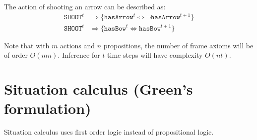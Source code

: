 \begin{description}
        \begin{example}
            The action of shooting an arrow can be described as:
            \[
                \begin{split}
                    \texttt{SHOOT}^t &\Rightarrow \{ \texttt{hasArrow}^t \iff \lnot\texttt{hasArrow}^{t+1} \} \\
                    \texttt{SHOOT}^t &\Rightarrow \{ \texttt{hasBow}^t \iff \texttt{hasBow}^{t+1} \}
                \end{split}  
            \]
        \end{example}

        Note that with $m$ actions and $n$ propositions, the number of frame axioms will be of order $O(mn)$.
        Inference for $t$ time steps will have complexity $O(nt)$.
\end{description}



\section{Situation calculus (Green's formulation)}
Situation calculus uses first order logic instead of propositional logic.

